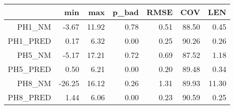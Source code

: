 \begin{table}[ht]
\centering
\begin{tabular}{rrrrrrr}
  \toprule
 & min & max & p\_bad & RMSE & COV & LEN \\ 
  \midrule
PH1\_NM & -3.67 & 11.92 & 0.78 & 0.51 & 88.50 & 0.45 \\ 
  PH1\_PRED & 0.17 & 6.32 & 0.00 & 0.25 & 90.26 & 0.26 \\ 
  PH5\_NM & -5.17 & 17.21 & 0.72 & 0.69 & 87.52 & 1.18 \\ 
  PH5\_PRED & 0.50 & 6.21 & 0.00 & 0.20 & 89.48 & 0.34 \\ 
  PH8\_NM & -26.25 & 16.12 & 0.26 & 1.31 & 89.93 & 11.30 \\ 
  PH8\_PRED & 1.44 & 6.06 & 0.00 & 0.23 & 90.59 & 0.25 \\ 
   \bottomrule
\end{tabular}
\end{table}
